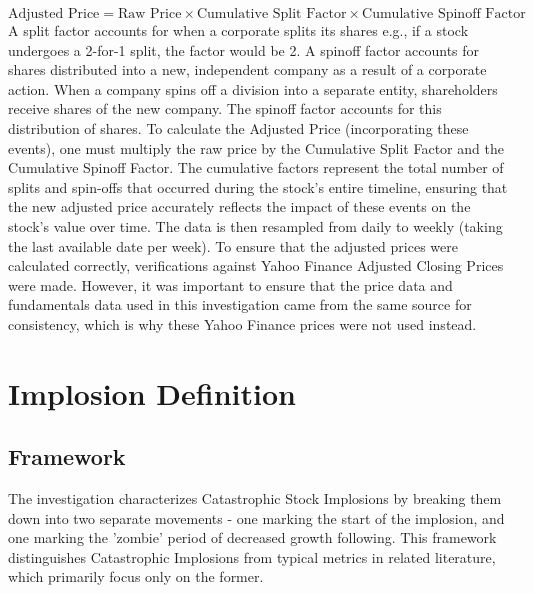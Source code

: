\documentclass[a4paper]{report}
\begin{document}
\begin{equation}\label{eq:adjusted_price}
  \text{Adjusted Price} = \text{Raw Price} \times \text{Cumulative Split Factor} \times \text{Cumulative Spinoff Factor}
\end{equation}
A split factor accounts for when a corporate splits its shares e.g., if a stock undergoes a 2-for-1 split, the factor would be 2. A spinoff factor accounts for shares distributed into a new, independent company as a result of a corporate action. 
When a company spins off a division into a separate entity, shareholders receive shares of the new company. The spinoff factor accounts for this distribution of shares. To calculate the Adjusted Price (incorporating these events), one must multiply the raw price by the 
Cumulative Split Factor and the Cumulative Spinoff Factor. The cumulative factors represent the total number of splits and spin-offs that occurred during the stock's entire timeline, ensuring that the new adjusted price accurately reflects the impact of these events on the stock's value over time. The 
data is then resampled from daily to weekly (taking the last available date per week). To ensure that the adjusted prices were calculated correctly, verifications against 
Yahoo Finance Adjusted Closing Prices were made. However, it was important to ensure that the price data and fundamentals data used in this investigation came from the same source for consistency, which is why these Yahoo Finance prices were not used instead.

\section{Implosion Definition}

\subsection{Framework}
The investigation characterizes Catastrophic Stock Implosions by breaking them down into two separate movements - one marking the start of the implosion, and one marking the 'zombie' period of decreased growth following. This framework distinguishes Catastrophic Implosions from typical metrics in related literature, 
which primarily focus only on the former. 

\end{document}
